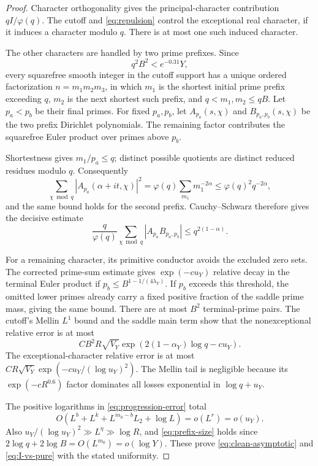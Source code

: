 \begin{proof}
Character orthogonality gives the principal-character contribution
\(qI/\varphi(q)\).  The cutoff and \eqref{eq:repulsion} control
the exceptional real character, if it induces a character modulo
\(q\).  There is at most one such induced character.

The other characters are handled by two prime prefixes.  Since
\begin{equation}\label{eq:prefix-size}
 q^2B^2<e^{-0.31}Y,
\end{equation}
every squarefree smooth integer in the cutoff support has a unique
ordered factorization \(n=m_1m_2m_3\), in which \(m_1\) is the
shortest initial prime prefix exceeding \(q\), \(m_2\) is the next
shortest such prefix, and
\(q<m_1,m_2\le qB\).  Let \(p_a<p_b\) be their final primes.
For fixed \(p_a,p_b\), let \(A_{p_a}(s,\chi)\) and
\(B_{p_a,p_b}(s,\chi)\) be the two prefix Dirichlet polynomials.
The remaining factor contributes the squarefree Euler product over
primes above \(p_b\).

Shortestness gives \(m_1/p_a\le q\); distinct possible quotients
are distinct reduced residues modulo \(q\).  Consequently
\[
 \sum_{\chi\bmod q}|A_{p_a}(\alpha+it,\chi)|^2
 =\varphi(q)\sum_{m_1}m_1^{-2\alpha}
 \le\varphi(q)^2q^{-2\alpha},
\]
and the same bound holds for the second prefix.  Cauchy--Schwarz
therefore gives the decisive estimate
\begin{equation}\label{eq:prefix-cs}
 \frac q{\varphi(q)}
       \sum_{\chi\bmod q}|A_{p_a}B_{p_a,p_b}|
 \le q^{2(1-\alpha)}.
\end{equation}

For a remaining character, its primitive conductor avoids the
excluded zero sets.  The corrected prime-sum estimate gives
\(\exp(-cu_Y)\) relative decay in the terminal Euler product if
\(p_b\le B^{1-1/(4\lambda_Y)}\).  If \(p_b\) exceeds this threshold,
the omitted lower primes already carry a fixed positive fraction
of the saddle prime mass, giving the same bound.  There are at
most \(B^2\) terminal-prime pairs.  The cutoff's Mellin \(L^1\)
bound and the saddle main term show that the nonexceptional relative
error is at most
\begin{equation}\label{eq:progression-error}
 CB^2R\sqrt{V_Y}
       \exp(2(1-\alpha_Y)\log q-cu_Y).
\end{equation}
The exceptional-character relative error is at most
\(CR\sqrt{V_Y}\exp(-cu_Y/(\log u_Y)^2)\).
The Mellin tail is negligible because its
\(\exp(-cR^{0.6})\) factor dominates all losses exponential in
\(\log q+u_Y\).

The positive logarithms in \eqref{eq:progression-error} total
\[
 O(L^b+L^k+L^{m_0-b}L_2+\log L)=o(L^r)=o(u_Y).
\]
Also \(u_Y/(\log u_Y)^2\gg L^\eta\gg\log R\), and
\eqref{eq:prefix-size} holds since
\(2\log q+2\log B=O(L^{m_0})=o(\log Y)\).
These prove \eqref{eq:clean-asymptotic} and
\eqref{eq:I-vs-pure} with the stated uniformity.
\end{proof}

